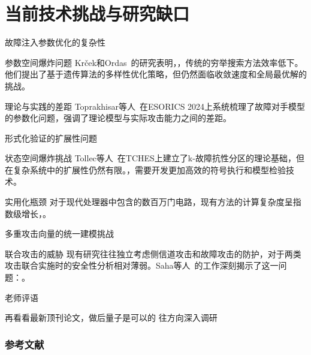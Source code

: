 \documentclass{beamer}
\begin{document}
\section{当前技术挑战与研究缺口}
\begin{frame}{故障注入参数优化的复杂性}
  \begin{block}{参数空间爆炸问题}
    Krček和Ordas~\cite{ESORICS:KrcOrd24}的研究表明，，传统的穷举搜索方法效率低下。他们提出了基于遗传算法的多样性优化策略，但仍然面临收敛速度和全局最优解的挑战。
  \end{block}
  
  \begin{block}{理论与实践的差距}
    Toprakhisar等人~\cite{ESORICS:TopNikNik24}在ESORICS 2024上系统梳理了故障对手模型的参数化问题，强调了理论模型与实际攻击能力之间的差距。
  \end{block}
\end{frame}

\begin{frame}{形式化验证的扩展性问题}
  \begin{block}{状态空间爆炸挑战}
    Tollec等人~\cite{TCHES:THNABC24}在TCHES上建立了k-故障抗性分区的理论基础，但在复杂系统中的扩展性仍然有限。，需要开发更加高效的符号执行和模型检验技术。
  \end{block}
  
  \begin{block}{实用化瓶颈}
    对于现代处理器中包含的数百万门电路，现有方法的计算复杂度呈指数级增长，。
  \end{block}
\end{frame}

\begin{frame}{多重攻击向量的统一建模挑战}
  \begin{block}{联合攻击的威胁}
    现有研究往往独立考虑侧信道攻击和故障攻击的防护，对于两类攻击联合实施时的安全性分析相对薄弱。Saha等人~\cite{COSADE:SahBagJapMuk21}的工作深刻揭示了这一问题：。
  \end{block}
\end{frame}


\begin{frame}{老师评语}
    \begin{alertblock}{再看看最新顶刊论文，做后量子是可以的}
      往方向深入调研
    \end{alertblock}
\end{frame}

\begin{frame}[allowframebreaks]
  \frametitle{参考文献}
  
  
\end{frame}
\end{document}
